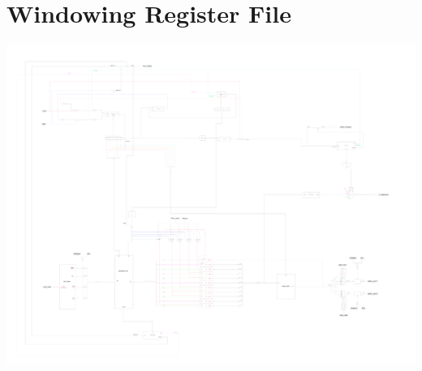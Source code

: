 \section{Windowing Register File}
 \mbox{} \begin{center}
	\begin{sideways}
		\begin{minipage}{1\linewidth}
			\includegraphics[width=1\textwidth]{chapters/11_Appendix/images/wrf.pdf}
			\label{figure:wrf_complex}
		\end{minipage}
	\end{sideways}
\end{center}
